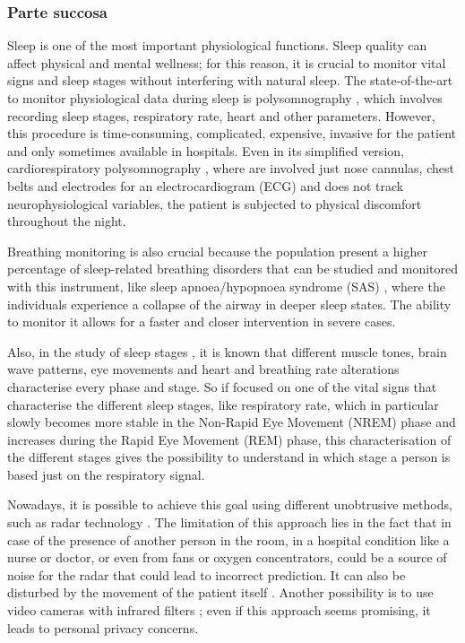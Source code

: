 \subsubsection{Parte succosa}
Sleep is one of the most important physiological functions. Sleep quality can affect physical and mental wellness; for this reason, it is crucial to monitor vital signs and sleep stages without interfering with natural sleep. 
The state-of-the-art to monitor physiological data during sleep is polysomnography \cite{Penzel2016ModulationsPolysomnography}, which involves recording sleep stages, respiratory rate, heart and other parameters. However, this procedure is time-consuming, complicated, expensive,
 invasive for the patient and only sometimes available in hospitals. Even in its simplified version, cardiorespiratory polysomnography \cite{CallejaComparisonApnoea}, where are involved just nose cannulas, chest belts and electrodes for an electrocardiogram (ECG) and does not track neurophysiological variables, the patient is subjected to physical discomfort throughout the night.

Breathing monitoring is also crucial because the population present a higher percentage of 
sleep-related breathing disorders that can be studied and monitored with this instrument, like sleep apnoea/hypopnoea syndrome (SAS) \cite{SasPatients}, 
where the individuals experience a collapse 
of the airway in deeper sleep states. The ability to monitor it allows for a faster and closer intervention in severe cases. 

Also, in the study of sleep stages \cite{Gasmi2020SleepVariables}, it is known that different muscle tones, brain wave patterns, eye movements and heart and breathing rate alterations characterise every phase and stage.
So if focused on one of the vital signs that characterise the different sleep stages, like respiratory rate, which in particular slowly becomes more stable in the Non-Rapid Eye Movement (NREM) phase and increases during the Rapid Eye Movement (REM) phase, this characterisation of the different stages gives the possibility to understand in which stage a person is based just on the respiratory signal\cite{Pal2022BreathingWakefulness}.

Nowadays, it is possible to achieve this goal using different unobtrusive methods, such as radar technology \cite{RadarSensor}. The limitation of this approach lies in the fact that in case of the presence of another person in the room, in a hospital condition like a nurse or doctor, or even from fans or oxygen concentrators, could be a source of noise for the radar that could lead to incorrect prediction. It can also be disturbed by the movement of the patient itself \cite{LauteslagerValidation}. Another possibility is to use video cameras with infrared filters \cite{CamerasBasedVitalSigns}; even if this approach seems promising, it leads to personal privacy concerns. 

